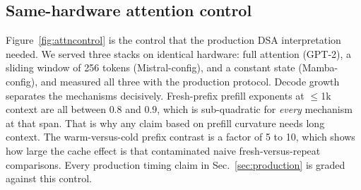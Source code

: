 \subsection{Same-hardware attention control}
\label{sec:attncontrol}
Figure~\ref{fig:attncontrol} is the control that the production DSA interpretation
needed.  We served three stacks on identical hardware: full attention (GPT-2), a
sliding window of 256 tokens (Mistral-config), and a constant state (Mamba-config), and
measured all three with the production protocol.  Decode growth separates the
mechanisms decisively.  Fresh-prefix prefill exponents at $\le$1k context are all
between $0.8$ and $0.9$, which is sub-quadratic for \emph{every} mechanism at that span.
That is why any claim based on prefill curvature needs long context.  The warm-versus-cold
prefix contrast is a factor of 5 to 10, which shows how large the cache effect is that
contaminated naive fresh-versus-repeat comparisons.  Every production timing claim in
Sec.~\ref{sec:production} is graded against this control.
